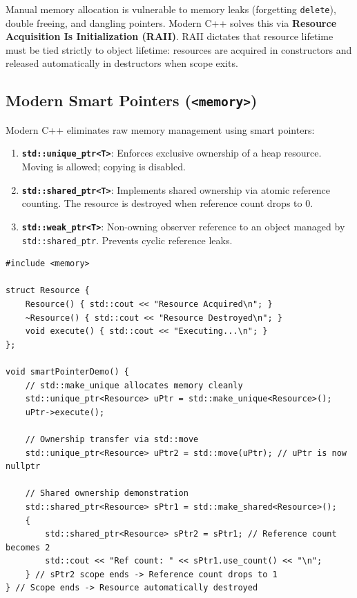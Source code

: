 \documentclass[10pt,journal,compsoc,onecolumn]{IEEEtran}
\begin{document}
Manual memory allocation is vulnerable to memory leaks (forgetting \texttt{delete}), double freeing, and dangling pointers. Modern C++ solves this via \textbf{Resource Acquisition Is Initialization (RAII)}. RAII dictates that resource lifetime must be tied strictly to object lifetime: resources are acquired in constructors and released automatically in destructors when scope exits.

\subsection{Modern Smart Pointers (\texttt{<memory>})}
Modern C++ eliminates raw memory management using smart pointers:

\begin{enumerate}
    \item \textbf{\texttt{std::unique\_ptr<T>}}: Enforces exclusive ownership of a heap resource. Moving is allowed; copying is disabled.
    \item \textbf{\texttt{std::shared\_ptr<T>}}: Implements shared ownership via atomic reference counting. The resource is destroyed when reference count drops to 0.
    \item \textbf{\texttt{std::weak\_ptr<T>}}: Non-owning observer reference to an object managed by \texttt{std::shared\_ptr}. Prevents cyclic reference leaks.
\end{enumerate}

\begin{verbatim}
#include <memory>

struct Resource {
    Resource() { std::cout << "Resource Acquired\n"; }
    ~Resource() { std::cout << "Resource Destroyed\n"; }
    void execute() { std::cout << "Executing...\n"; }
};

void smartPointerDemo() {
    // std::make_unique allocates memory cleanly
    std::unique_ptr<Resource> uPtr = std::make_unique<Resource>();
    uPtr->execute();
    
    // Ownership transfer via std::move
    std::unique_ptr<Resource> uPtr2 = std::move(uPtr); // uPtr is now nullptr
    
    // Shared ownership demonstration
    std::shared_ptr<Resource> sPtr1 = std::make_shared<Resource>();
    {
        std::shared_ptr<Resource> sPtr2 = sPtr1; // Reference count becomes 2
        std::cout << "Ref count: " << sPtr1.use_count() << "\n";
    } // sPtr2 scope ends -> Reference count drops to 1
} // Scope ends -> Resource automatically destroyed
\end{verbatim}
\end{document}
